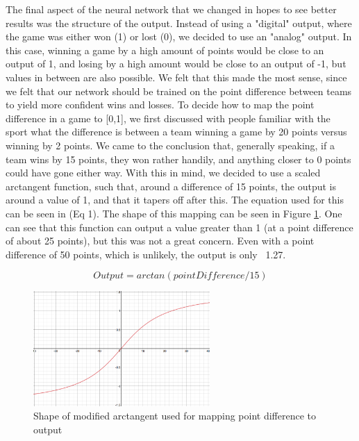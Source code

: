 The final aspect of the neural network that we changed in hopes to see better results was the structure of the output. Instead of using a "digital" output, where the game was either won (1) or lost (0), we decided to use an "analog" output. In this case, winning a game by a high amount of points would be close to an output of 1, and losing by a high amount would be close to an output of -1, but values in between are also possible. We felt that this made the most sense, since we felt that our network should be trained on the point difference between teams to yield more confident wins and losses. To decide how to map the point difference in a game to [0,1], we first discussed with people familiar with the sport what the difference is between a team winning a game by 20 points versus winning by 2 points. We came to the conclusion that, generally speaking, if a team wins by 15 points, they won rather handily, and anything closer to 0 points could have gone either way. With this in mind, we decided to use a scaled arctangent function, such that, around a difference of 15 points, the output is around a value of 1, and that it tapers off after this. The equation used for this can be seen in (Eq 1). The shape of this mapping can be seen in Figure \ref{fig:arctanShape}. One can see that this function can output a value greater than 1 (at a point difference of about 25 points), but this was not a great concern. Even with a point difference of 50 points, which is unlikely, the output is only ~1.27.

\begin{equation}
Output = arctan(pointDifference/15)
\end{equation}

\begin{figure}[ht]
    \centering
    \includegraphics[width=0.6\textwidth]{figures/arctanShape}
    \caption{Shape of modified arctangent used for mapping point difference to output}
    \label{fig:arctanShape}
\end{figure}


